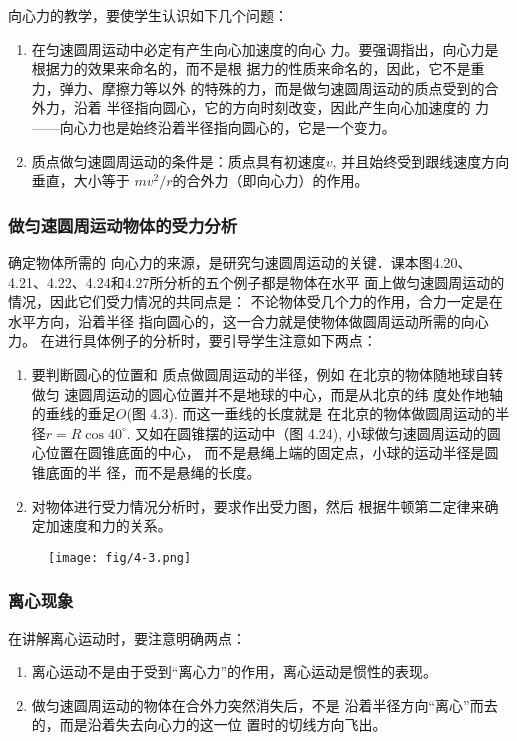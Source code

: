 向心力的教学，要使学生认识如下几个问题：
\begin{enumerate}
\item 在匀速圆周运动中必定有产生向心加速度的向心
力。要强调指出，向心力是根据力的效果来命名的，而不是根
据力的性质来命名的，因此，它不是重力，弹力、摩擦力等以外
的特殊的力，而是做匀速圆周运动的质点受到的合外力，沿着
半径指向圆心，它的方向时刻改变，因此产生向心加速度的
力——向心力也是始终沿着半径指向圆心的，它是一个变力。
\item 质点做匀速圆周运动的条件是：质点具有初速度$v$,
并且始终受到跟线速度方向垂直，大小等于
$mv^2/r$的合外力（即向心力）的作用。
\end{enumerate}

\subsubsection{做匀速圆周运动物体的受力分析}

确定物体所需的
向心力的来源，是研究匀速圆周运动的关键．课本图4.20、
4.21、4.22、4.24和4.27所分析的五个例子都是物体在水平
面上做匀速圆周运动的情况，因此它们受力情况的共同点是：
不论物体受几个力的作用，合力一定是在水平方向，沿着半径
指向圆心的，这一合力就是使物体做圆周运动所需的向心力。
在进行具体例子的分析时，要引导学生注意如下两点：

\begin{enumerate}
\item 要判断圆心的位置和
质点做圆周运动的半径，例如
在北京的物体随地球自转做匀
速圆周运动的圆心位置并不是地球的中心，而是从北京的纬
度处作地轴的垂线的垂足$O$(图
4.3). 而这一垂线的长度就是
在北京的物体做圆周运动的半
径$r=R\cos40^{\circ}$. 又如在圆锥摆的运动中（图
4.24), 小球做匀速圆周运动的圆心位置在圆锥底面的中心，
而不是悬绳上端的固定点，小球的运动半径是圆锥底面的半
径，而不是悬绳的长度。
\item 对物体进行受力情况分析时，要求作出受力图，然后
根据牛顿第二定律来确定加速度和力的关系。
\end{enumerate}

\begin{figure}[htp]
    \centering
    \texttt{[image: fig/4-3.png]}
    \caption{}
\end{figure}


\subsubsection{离心现象}

在讲解离心运动时，要注意明确两点：
\begin{enumerate}
    \item 离心运动不是由于受到“离心力”的作用，离心运动是惯性的表现。
    \item 做匀速圆周运动的物体在合外力突然消失后，不是
    沿着半径方向“离心”而去的，而是沿着失去向心力的这一位
    置时的切线方向飞出。
\end{enumerate}

